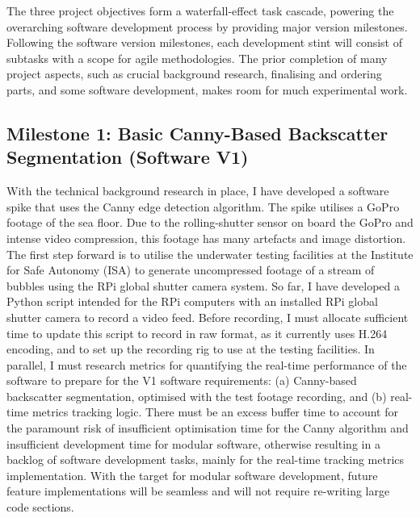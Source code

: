 The three project objectives form a waterfall-effect task cascade, powering the overarching software development process by providing major version milestones. Following the software version milestones, each development stint will consist of subtasks with a scope for agile methodologies. The prior completion of many project aspects, such as crucial background research, finalising and ordering parts, and some software development, makes room for much experimental work.

\subsection{Milestone 1: Basic Canny-Based Backscatter Segmentation (Software V1)}
With the technical background research in place, I have developed a software spike that uses the Canny edge detection algorithm. The spike utilises a GoPro footage of the sea floor. Due to the rolling-shutter sensor on board the GoPro and intense video compression, this footage has many artefacts and image distortion. The first step forward is to utilise the underwater testing facilities at the Institute for Safe Autonomy (ISA) to generate uncompressed footage of a stream of bubbles using the RPi global shutter camera system. So far, I have developed a Python script intended for the RPi computers with an installed RPi global shutter camera to record a video feed. Before recording, I must allocate sufficient time to update this script to record in raw format, as it currently uses H.264 encoding, and to set up the recording rig to use at the testing facilities. In parallel, I must research metrics for quantifying the real-time performance of the software to prepare for the V1 software requirements: (a) Canny-based backscatter segmentation, optimised with the test footage recording, and (b) real-time metrics tracking logic. There must be an excess buffer time to account for the paramount risk of insufficient optimisation time for the Canny algorithm and insufficient development time for modular software, otherwise resulting in a backlog of software development tasks, mainly for the real-time tracking metrics implementation. With the target for modular software development, future feature implementations will be seamless and will not require re-writing large code sections.


